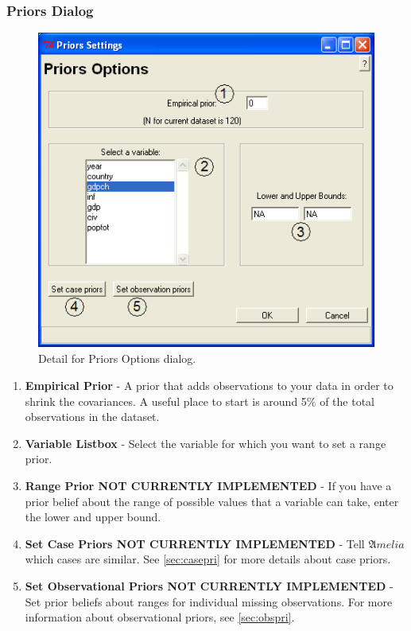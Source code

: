 \documentclass[12pt,titlepage]{article}
\begin{document}
\subsubsection{Priors Dialog}
\label{sec:pridiag}
\begin{figure}[ht]
  \centering \includegraphics[scale=.75]{priors.png}
  \caption{Detail for Priors Options dialog.}
\end{figure}
\begin{enumerate}
\item \textbf{Empirical Prior} - A prior that adds observations to
  your data in order to shrink the covariances.  A useful place to
  start is around 5\% of the total observations in the dataset.
\item \textbf{Variable Listbox} - Select the variable for which you
  want to set a range prior.
\item \textbf{Range Prior \textbf{NOT CURRENTLY IMPLEMENTED}} - If you
  have a prior belief about the range of possible values that a
  variable can take, enter the lower and upper bound.
\item \textbf{Set Case Priors \textbf{NOT CURRENTLY IMPLEMENTED}} -
  Tell ${\mathfrak Amelia}$ which cases are similar.  See
  \ref{sec:casepri} for more details about case priors.
\item \textbf{Set Observational Priors \textbf{NOT CURRENTLY
      IMPLEMENTED}} - Set prior beliefs about ranges for individual
  missing observations.  For more information about observational
  priors, see \ref{sec:obspri}.
\end{enumerate}
\end{document}
